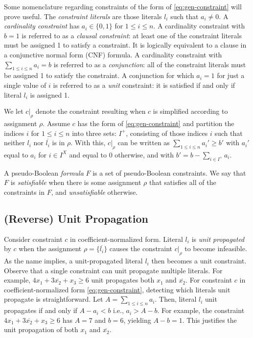\documentclass{fmcad}
\begin{document}
Some nomenclature regarding constraints of the form of \ref{eq:gen-constraint} will prove useful.
The \textit{constraint literals} are those literals $l_i$ such that $a_i \neq 0$.
A \textit{cardinality constraint} has $a_i \in \{0, 1\}$ for $1 \leq i \leq n$. A cardinality
constraint with $b = 1$ is referred to as a \textit{clausal constraint}: at least one of the
constraint literals must be assigned 1 to satisfy a constraint. It is logically equivalent
to a clause in a conjunctive normal form (CNF) formula. A cardinality constraint with
$\sum_{1 \leq i \leq n} a_i = b$ is referred to as a \textit{conjunction}: all of the constraint
literals must be assigned 1 to satisfy the constraint. A conjunction for which $a_i = 1$ for just
a single value of $i$ is referred to as a \textit{unit} constraint: it is satisfied if and only
if literal $l_i$ is assigned 1.

We let $c|_{\rho}$ denote the constraint resulting when $c$ is simplified according
to assignment $\rho$. Assume $c$ has the form of \ref{eq:gen-constraint} and partition the indices
$i$ for $1 \leq i \leq n$ into three sets: $I^+$, consisting of those indices $i$ such that
neither $l_i$ nor $\overline{l_i}$ is in $\rho$. With this, $c|_\rho$ can be written as
$\sum_{1 \leq i \leq n} a_i' \geq b'$ with $a_i'$ equal to $a_i$ for $i \in I^X$ and equal to 0
otherwise, and with $b' = b - \sum_{i \in I^+} a_i$.

A pseudo-Boolean \textit{formula} $F$ is a set of pseudo-Boolean constraints. We say that $F$ is
\textit{satisfiable} when there is some assignment $\rho$ that satisfies all of the constraints in
$F$, and \textit{unsatisfiable} otherwise.

\subsection{(Reverse) Unit Propagation}
Consider constraint $c$ in coefficient-normalized form. Literal $l_i$ is \textit{unit propagated}
by $c$ when the assignment $\rho = \{\overline{l_i}\}$ causes the constraint $c|_\rho$ to become
infeasible. As the name implies, a unit-propagated literal $l_i$ then becomes a unit constraint.
Observe that a single constraint can unit propagate multiple literals. For example,
$4x_1 + 3\overline{x_2} + x_3 \geq 6$ unit propagates both $x_1$ and $\overline{x_2}$. For constraint
$c$ in coefficient-normalized form \ref{eq:gen-constraint}, detecting which literals unit propagate
is straightforward. Let $A = \sum_{1 \leq i \leq n} a_i$. Then, literal $l_i$ unit propagates if
and only if $A - a_i < b$ i.e., $a_i > A - b$. For example, the constraint
$4 x_1 + 3 \overline{x_2} + x_3 \geq 6$ has $A = 7$ and $b = 6$, yielding $A - b = 1$. This
justifies the unit propagation of both $x_1$ and $\overline{x_2}$.
\end{document}
